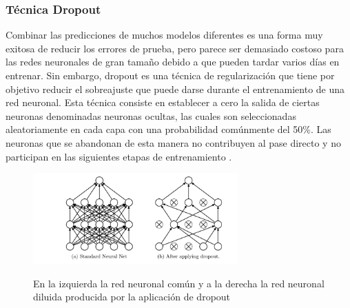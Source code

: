 		\vskip 0.4cm 
	\subsubsection {Técnica Dropout}
		
		Combinar las predicciones de muchos modelos diferentes es una forma muy exitosa de reducir los errores de prueba, pero parece ser demasiado costoso para las redes neuronales de gran tamaño debido a que pueden tardar varios días en entrenar. Sin embargo, dropout es una técnica de regularización que tiene por objetivo reducir el sobreajuste que puede darse durante el entrenamiento de una red neuronal. Esta técnica consiste en establecer a cero la salida de ciertas neuronas denominadas neuronas ocultas, las cuales son seleccionadas aleatoriamente en cada capa con una probabilidad comúnmente del 50\%. Las neuronas que se abandonan de esta manera no contribuyen al pase directo y no participan en las siguientes etapas de entrenamiento \citep{AulaDNN}.

		\begin{figure}[H]
		\begin{center}
		\includegraphics[width=0.7\textwidth]{images/marcoteorico/dropout_sample}
		\end{center}
		\begin{center}
		\caption{\small{En la izquierda la red neuronal común y a la derecha la red neuronal diluida producida por la aplicación de dropout}}
		{\small{\cite{AulaDNN}}}
		\end{center}
		\vspace{-1.5em}
		\end{figure}
		

